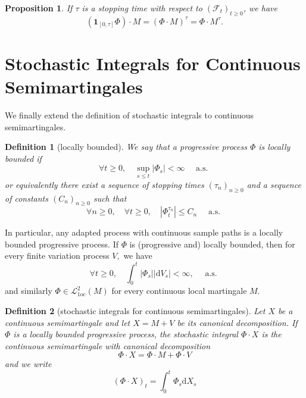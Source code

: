 \documentclass{report}
\newtheorem{definition}{Definition}[section]
\newtheorem{proposition}{Proposition}[section]
\theoremstyle{nonumberplain}
\begin{document}
\begin{proposition}
	If $\tau$ is a stopping time with respect to $(\mathcal{F}_t)_{t\ge0}$, we have
	\[
	\left(\mathbf{1}_{[0, \tau]} \Phi\right) \cdot M=(\Phi \cdot M)^{\tau}=\Phi \cdot M^{\tau}.
	\]
\end{proposition}

\section{Stochastic Integrals for Continuous Semimartingales}
We finally extend the definition of stochastic integrals to continuous semimartingales. 
\begin{definition}[locally bounded]
We say that a progressive process $\Phi$ is locally bounded if
\[
\forall t \geq 0, \quad \sup _{s \leq t}\left|\Phi_{s}\right|<\infty \quad \text { a.s. }
\]
or equivalently there exist a sequence of stopping times $(\tau_{n})_{n \geq 0}$ and a sequence of constants $(C_n)_{n \geq 0}$ such that
\[
\forall n \geq 0, \quad \forall t \geq 0, \quad \left|\Phi_{t}^{\tau_{n}}\right| \leq C_{n}\quad \text { a.s. }
\]
\end{definition}

In particular, any adapted process with continuous sample paths is a locally bounded progressive process. If $\Phi$ is (progressive and) locally bounded, then for every finite variation process $V,$ we have
\[
\forall t \geq 0, \quad \int_{0}^{t}\left|\Phi_{s}\right|\left|\mathrm{d} V_{s}\right|<\infty, \quad \text { a.s. }
\]
and similarly $\Phi \in \mathscr{L}_{1 \mathrm{oc}}^{2}(M)$ for every continuous local martingale $M$.

\begin{definition}[stochastic integrals for continuous semimartingales]
	Let $X$ be a continuous semimartingale and let $X=M+V$ be its canonical decomposition. If $\Phi$ is a locally bounded progressive process, the stochastic integral $\Phi \cdot X$ is the continuous semimartingale with canonical decomposition
	\[
	\Phi \cdot X=\Phi \cdot M+\Phi \cdot V
	\]
	and we write
	\[
	(\Phi \cdot X)_{t}=\int_{0}^{t} \Phi_{s} \mathrm{d} X_{s}
	\]
\end{definition}
\end{document}
